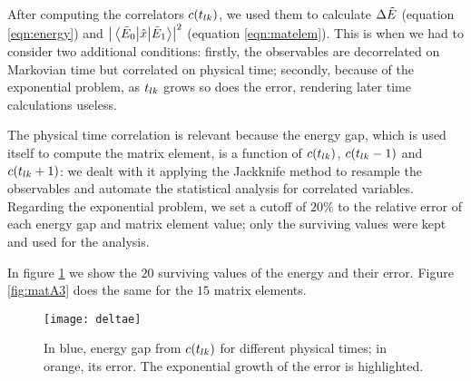 After computing the correlators $c(t_{lk})$, we used them to calculate $\Delta \tilde{E}$ (equation \ref{eqn:energy}) and $\abs{\mel{\tilde{E}_0}{\hat{x}}{\tilde{E}_1}} ^2$ (equation \ref{eqn:matelem}). This is when we had to consider two additional conditions: firstly, the observables are decorrelated on Markovian time but correlated on physical time; secondly, because of the exponential problem, as $t_{lk}$ grows so does the error, rendering later time calculations useless.

The physical time correlation is relevant because the energy gap, which is used itself to compute the matrix element,  is a
function of $c(t_{lk})$, $c(t_{lk}-1)$ and $c(t_{lk}+1)$: we dealt with it applying the Jackknife method to resample the observables and automate the
statistical analysis for correlated variables. Regarding the exponential problem, we set a cutoff of $20\%$ to the relative error of each energy gap and matrix element value; only the surviving values were kept and used for the analysis.

In figure \ref{fig:energyA3} we show the $20$ surviving values of the energy and their error. Figure \ref{fig:matA3} does the same for the $15$ matrix elements.
\begin{figure}[H]
  \centering
  \texttt{[image: deltae]}
  \caption{\label{fig:energyA3}In blue, energy gap from $c(t_{lk})$ for different physical times; in orange, its error. The exponential growth of the error
  is highlighted.}
\end{figure}


